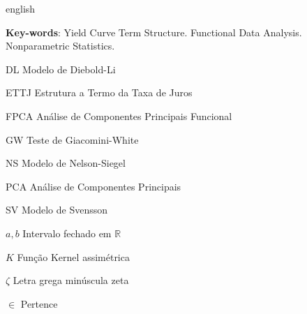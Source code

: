 \documentclass[
	12pt,				%
	openright,			%
	oneside,			%
	a4paper,			%
	english,			%
	brazil				%
	]{dissertacao-ufrgs-abntex2}
\begin{document}
\begin{resumo}[Abstract]
 \begin{otherlanguage*}{english}

   \vspace{\onelineskip}

   \noindent 
   \textbf{Key-words}: Yield Curve Term Structure. Functional Data Analysis. Nonparametric Statistics.
 \end{otherlanguage*}
\end{resumo}



\begin{siglas}
  \item[DL] Modelo de Diebold-Li
  \item[ETTJ] Estrutura a Termo da Taxa de Juros
  \item[FPCA] Análise de Componentes Principais Funcional
  \item[GW] Teste de Giacomini-White
  \item[NS] Modelo de Nelson-Siegel
  \item[PCA] Análise de Componentes Principais
  \item[SV] Modelo de Svensson
\end{siglas}

\begin{simbolos}
  \item[$ a,b $] Intervalo fechado em $\mathbb{R}$
  \item[$ K $] Função Kernel assimétrica
  \item[$ \zeta $] Letra grega minúscula zeta
  \item[$ \in $] Pertence
\end{simbolos}


\setcounter{tocdepth}{2}
\tableofcontents*
\cleardoublepage



\textual
\end{document}
